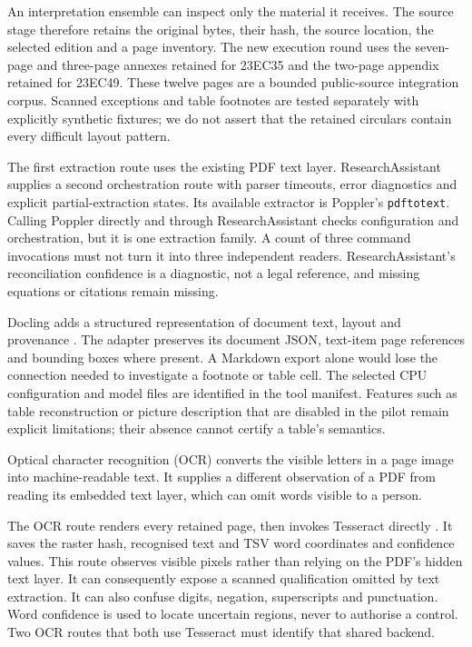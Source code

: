 An interpretation ensemble can inspect only the material it receives. The source
stage therefore retains the original bytes, their hash, the source location,
the selected edition and a page inventory. The new execution round uses the
seven-page and three-page annexes retained for 23EC35 and the two-page appendix
retained for 23EC49. These twelve pages are a bounded public-source integration
corpus. Scanned exceptions and table footnotes are tested separately with
explicitly synthetic fixtures; we do not assert that the retained circulars
contain every difficult layout pattern.

The first extraction route uses the existing PDF text layer. ResearchAssistant
supplies a second orchestration route with parser timeouts, error diagnostics and
explicit partial-extraction states. Its available extractor is Poppler's
\texttt{pdftotext}. Calling Poppler directly and through ResearchAssistant checks
configuration and orchestration, but it is one extraction family. A count of
three command invocations must not turn it into three independent readers.
ResearchAssistant's reconciliation confidence is a diagnostic, not a legal
reference, and missing equations or citations remain missing.

Docling adds a structured representation of document text, layout and provenance
\citep{doclingsoftware}. The adapter preserves its document JSON, text-item page
references and bounding boxes where present. A Markdown export alone would lose
the connection needed to investigate a footnote or table cell. The selected
CPU configuration and model files are identified in the tool manifest. Features
such as table reconstruction or picture description that are disabled in the
pilot remain explicit limitations; their absence cannot certify a table's
semantics.

Optical character recognition (OCR) converts the visible letters in a page image
into machine-readable text. It supplies a different observation of a PDF from
reading its embedded text layer, which can omit words visible to a person.

The OCR route renders every retained page, then invokes Tesseract directly
\citep{tesseractsoftware}. It saves the raster hash, recognised text and TSV word
coordinates and confidence values. This route observes visible pixels rather
than relying on the PDF's hidden text layer. It can consequently expose a scanned
qualification omitted by text extraction. It can also confuse digits, negation,
superscripts and punctuation. Word confidence is used to locate uncertain
regions, never to authorise a control. Two OCR routes that both use Tesseract
must identify that shared backend.

